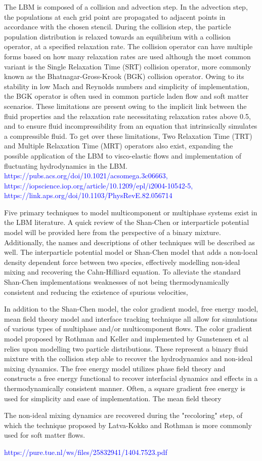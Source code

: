 The LBM is composed of a collision and advection step. In the advection step, the populations at each grid point are propagated to adjacent points in accordance 
with the chosen stencil. During the collision step, the particle population distribution is relaxed towards an equilibrium with a collision operator, at a 
specified relaxation rate. The collision operator can have multiple forms based on how many relaxation rates are used although the most common variant is the 
Single Relaxation Time (SRT) collision operator, more commonly known as the Bhatnagar-Gross-Krook (BGK) collision operator. Owing to its stability in low Mach 
and Reynolds numbers and simplicity of implementation, the BGK operator is often used in common particle laden flow and soft matter scenarios. 
\cite{bhatnagar_model_1954} These limitations are present owing to the implicit link between the fluid properties and the relaxation rate necessitating 
relaxation rates above 0.5, and to ensure fluid incompressibility from an equation that intrinsically simulates a compressible fluid. To get over these 
limitations, Two Relaxation Time (TRT) and Multiple Relaxation Time (MRT) operators also exist, expanding the possible application of the LBM to visco-elastic 
flows and implementation of fluctuating hydrodynamics in the LBM. 
\textcolor{blue}{https://pubs.acs.org/doi/10.1021/acsomega.3c06663, https://iopscience.iop.org/article/10.1209/epl/i2004-10542-5, https://link.aps.org/doi/10.1103/PhysRevE.82.056714}

Five primary techniques to model multicomponent or multiphase systems exist in the LBM literature. A quick review of the Shan-Chen or 
interparticle potential model  will be provided here from the perspective of a binary mixture. Additionally, the names and descriptions of 
other techniques will be described as well. The interparticle potential model or Shan-Chen model that adds a non-local density dependent force 
between two species, effectively modelling non-ideal mixing and recovering the Cahn-Hilliard equation. To alleviate the standard Shan-Chen implementations 
weaknesses of not being thermodynamically consistent and reducing the existence of spurious velocities, 

In addition to the Shan-Chen model, the color gradient model, free energy model, mean field theory model and interface tracking technique all 
allow for simulations of various types of multiphase and/or multicomponent flows. The color gradient model proposed by Rothman and Keller and 
implemented by Gunstensen et al relies upon modelling two particle distributions. These represent a binary fluid mixture with the collision step 
able to recover the hydrodynamics and non-ideal mixing dynamics. The free energy model utilizes phase field theory and constructs a free energy 
functional to recover interfacial dynamics and effects in a thermodynamically consistent manner. Often, a square gradient free energy is used for 
simplicity and ease of implementation. The mean field theory 

The non-ideal mixing dynamics are recovered during the "recoloring" step, of which the technique proposed by Latva-Kokko and Rothman is more commonly 
used for soft matter flows.

\textcolor{blue}{https://pure.tue.nl/ws/files/25832941/1404.7523.pdf}